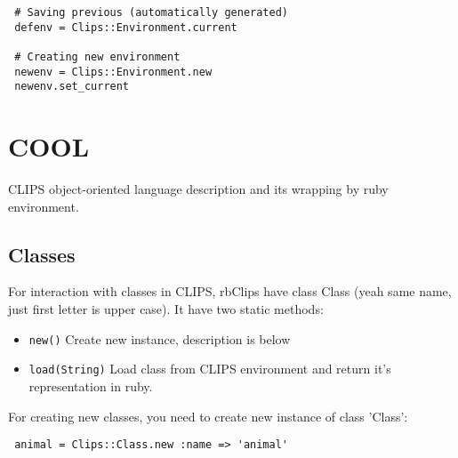\documentclass[a4paper,10pt]{article}
\begin{document}
\begin{verbatim}
 # Saving previous (automatically generated)
 defenv = Clips::Environment.current

 # Creating new environment
 newenv = Clips::Environment.new
 newenv.set_current
\end{verbatim}

\section{COOL}
CLIPS object-oriented language description and its wrapping by ruby environment.

\subsection{Classes}
For interaction with classes in CLIPS, rbClips have class Class (yeah same name, just first letter is upper case). It have two static methods:
\begin{itemize}
 \item \texttt{new()} Create new instance, description is below
 \item \texttt{load(String)} Load class from CLIPS environment and return it's representation in ruby.
\end{itemize}

For creating new classes, you need to create new instance of class 'Class':
\begin{verbatim}
 animal = Clips::Class.new :name => 'animal'
\end{verbatim}
\end{document}
